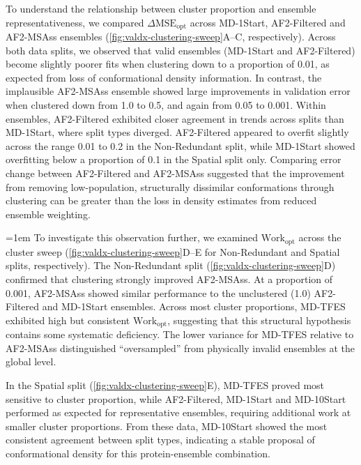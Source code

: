 To understand the relationship between cluster proportion and ensemble representativeness, we compared $\Delta \text{MSE}_{\text{opt}}$ across MD-1Start, AF2-Filtered and AF2-MSAss ensembles (\cref{fig:valdx-clustering-sweep}A--C, respectively). Across both data splits, we observed that valid ensembles (MD-1Start and AF2-Filtered) become slightly poorer fits when clustering down to a proportion of 0.01, as expected from loss of conformational density information. In contrast, the implausible AF2-MSAss ensemble showed large improvements in validation error when clustered down from 1.0 to 0.5, and again from 0.05 to 0.001. Within ensembles, AF2-Filtered exhibited closer agreement in trends across splits than MD-1Start, where split types diverged. AF2-Filtered appeared to overfit slightly across the range 0.01 to 0.2 in the Non-Redundant split, while MD-1Start showed overfitting below a proportion of 0.1 in the Spatial split only. Comparing error change between AF2-Filtered and AF2-MSAss suggested that the improvement from removing low-population, structurally dissimilar conformations through clustering can be greater than the loss in density estimates from reduced ensemble weighting.

{\emergencystretch=1em To investigate this observation further, we examined $\text{Work}_\text{opt}$ across the cluster sweep (\cref{fig:valdx-clustering-sweep}D--E for Non-Redundant and Spatial splits, respectively). The Non-Redundant split (\cref{fig:valdx-clustering-sweep}D) confirmed that clustering strongly improved AF2-MSAss. At a proportion of 0.001, AF2-MSAss showed similar performance to the unclustered (1.0) AF2-Filtered and MD-1Start ensembles. Across most cluster proportions, MD-TFES exhibited high but consistent $\text{Work}_\text{opt}$, suggesting that this structural hypothesis contains some systematic deficiency. The lower variance for MD-TFES relative to AF2-MSAss distinguished ``oversampled'' from physically invalid ensembles at the global level.\par}

In the Spatial split (\cref{fig:valdx-clustering-sweep}E), MD-TFES proved most sensitive to cluster proportion, while AF2-Filtered, MD-1Start and MD-10Start performed as expected for representative ensembles, requiring additional work at smaller cluster proportions. From these data, MD-10Start showed the most consistent agreement between split types, indicating a stable proposal of conformational density for this protein-ensemble combination.

